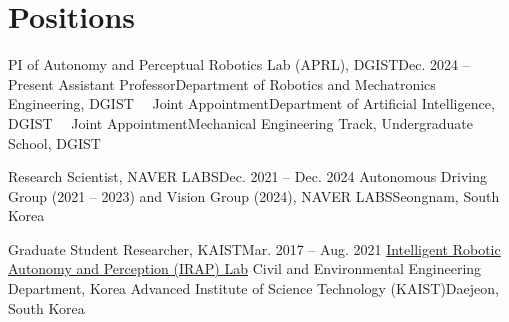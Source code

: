\section{Positions}
  \resumeSubHeadingListStart
    \resumeSubheadingFourLines
      {PI of Autonomy and Perceptual Robotics Lab (APRL), DGIST}{Dec. 2024 -- Present}
      {Assistant Professor}{Department of Robotics and Mechatronics Engineering, DGIST}
      { \ \ Joint Appointment}{Department of Artificial Intelligence, DGIST}
      { \ \ Joint Appointment}{Mechanical Engineering Track, Undergraduate School, DGIST}

    \vspace{1mm}
    \resumeSubheadingTwoLines
      {Research Scientist, NAVER LABS}{Dec. 2021 -- Dec. 2024}
      {Autonomous Driving Group (2021 -- 2023) and Vision Group (2024), NAVER LABS}{Seongnam, South Korea}

    \vspace{1mm}
    \resumeSubheadingThreeLines
      {Graduate Student Researcher, KAIST}{Mar. 2017 -- Aug. 2021}
      {\href{https://rpm.snu.ac.kr}{Intelligent Robotic Autonomy and Perception (IRAP) Lab}}{}
      {Civil and Environmental Engineering Department, Korea Advanced Institute of Science Technology (KAIST)}{Daejeon, South Korea}

    \resumeSubHeadingListEnd